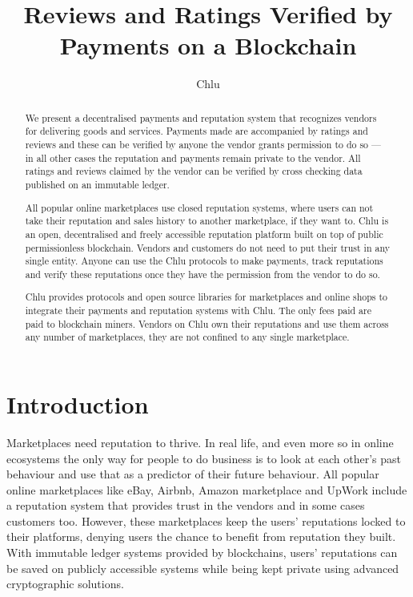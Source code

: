 \documentclass[a4paper]{article}
\title{Reviews and Ratings Verified by Payments on a Blockchain}
\author{
  Chlu
}
\begin{document}
\maketitle

\begin{abstract}

We present a decentralised payments and reputation system that
recognizes vendors for delivering goods and services. Payments made
are accompanied by ratings and reviews and these can be verified by
anyone the vendor grants permission to do so --- in all other cases the
reputation and payments remain private to the vendor. All ratings and
reviews claimed by the vendor can be verified by cross checking data
published on an immutable ledger.

All popular online marketplaces use closed reputation systems, where
users can not take their reputation and sales history to another
marketplace, if they want to. Chlu is an open, decentralised and
freely accessible reputation platform built on top of public
permissionless blockchain. Vendors and customers do not need to put
their trust in any single entity. Anyone can use the Chlu protocols to
make payments, track reputations and verify these reputations once
they have the permission from the vendor to do so.

Chlu provides protocols and open source libraries for marketplaces and
online shops to integrate their payments and reputation systems with
Chlu. The only fees paid are paid to blockchain miners. Vendors on
Chlu own their reputations and use them across any number of
marketplaces, they are not confined to any single marketplace.

\end{abstract}

\section{Introduction}

Marketplaces need reputation to thrive. In real life, and even more so
in online ecosystems the only way for people to do business is to look
at each other's past behaviour and use that as a predictor of their
future behaviour. All popular online marketplaces like eBay, Airbnb,
Amazon marketplace and UpWork include a reputation system that
provides trust in the vendors and in some cases customers
too. However, these marketplaces keep the users' reputations locked to
their platforms, denying users the chance to benefit from reputation
they built. With immutable ledger systems provided by blockchains,
users' reputations can be saved on publicly accessible systems while
being kept private using advanced cryptographic solutions.
\end{document}
